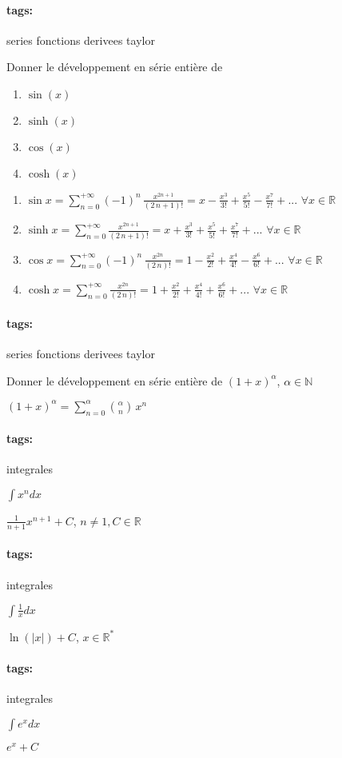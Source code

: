 \documentclass[12pt]{article}
\newcommand*{\xfield}[1]{\begin{mdframed}\centering #1\end{mdframed}\bigskip}
\newenvironment{note}{}{}
\newcommand*{\tags}[1]{\paragraph{tags: }#1}
\begin{document}
\begin{note}
\begin{note}
	\tags{series fonctions derivees taylor}
	\xfield{Donner le développement en série entière de
	\begin{enumerate}
	\item $\sin(x)$
	\item $\sinh(x)$
	\item $\cos(x)$
	\item $\cosh(x)$
	\end{enumerate} }
	\xfield{\begin{enumerate}
		\item $ \sin x=\sum\limits_{n=0}^{+{\infty}}(-1)^n\,{\frac{x^{2n+1}}{(2\,n+1)!}} = x - \frac{x^3}{3!} + \frac{x^5}{5!} - \frac{x^7}{7!} + ...$ $\forall x \in \mathbb{R}$
		\item $\sinh x = \sum\limits_{n=0}^{+{\infty}}{\frac{x^{2n+1}}{(2\,n+1)!}} = x + \frac{x^3}{3!} +  \frac{x^5}{5!} +  \frac{x^7}{7!} + ...$ $\forall x \in \mathbb{R}$
		\item $\cos x=\sum\limits_{n=0}^{+{\infty}}(-1)^n\,{\frac{x^{2n}}{(2\,n)!}} = 1 - \frac{x^2}{2!} +\frac{x^4}{4!} -\frac{x^6}{6!} +...$ $\forall x \in \mathbb{R}$
		\item $\cosh x = \sum\limits_{n=0}^{+{\infty}}{\frac{x^{2n}}{(2\,n)!}} = 1 +  \frac{x^2}{2!} +  \frac{x^4}{4!} + \frac{x^6}{6!} + ...$ $\forall x \in \mathbb{R}$
	\end{enumerate} }
\end{note}

\begin{note}
	\tags{series fonctions derivees taylor}
	\xfield{Donner le développement en série entière de $(1+x)^\alpha$, $\alpha \in \mathbb{N}$}
	\xfield{$(1+x)^\alpha = \sum\limits_{n=0}^{\alpha}{{\alpha \choose n}\, x^n}$}
\end{note}

\begin{note}
	\tags{integrales}
	\xfield{$\int x^n dx$}
	\xfield{$\frac{1}{n+1}x^{n+1} + C$, $n\neq 1, C\in \mathbb{R}$}
\end{note}

\begin{note}
	\tags{integrales}
	\xfield{$\int \frac{1}{x} dx$}
	\xfield{$\ln(\vert x\vert ) + C$, $x \in \mathbb{R}^*$}
\end{note}

\begin{note}
	\tags{integrales}
	\xfield{$\int e^x dx$}
	\xfield{$e^x + C$}
\end{note}


\end{note}
\end{document}
